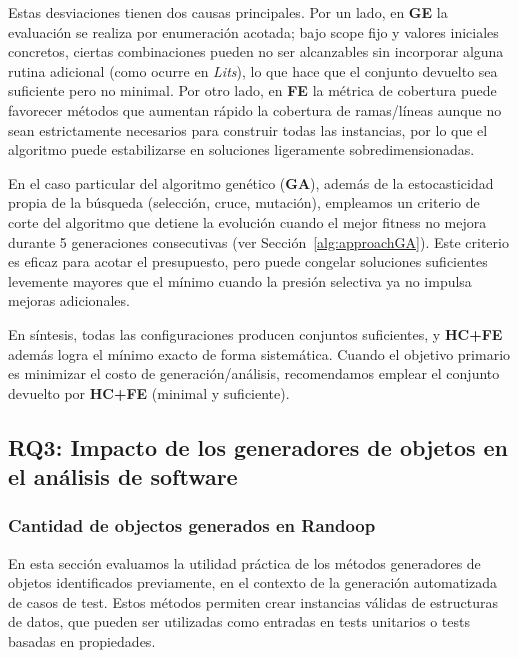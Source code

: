 Estas desviaciones tienen dos causas principales. Por un lado, en \textbf{GE} la
evaluación se realiza por enumeración acotada; bajo scope fijo y valores
iniciales concretos, ciertas combinaciones pueden no ser alcanzables sin
incorporar alguna rutina adicional (como ocurre en \emph{Lits}), lo que hace que
el conjunto devuelto sea suficiente pero no minimal. Por otro lado, en
\textbf{FE} la métrica de cobertura puede favorecer métodos que
aumentan rápido la cobertura de ramas/líneas aunque no sean estrictamente
necesarios para construir todas las instancias, por lo que el algoritmo puede estabilizarse en soluciones
ligeramente sobredimensionadas.

En el caso particular del algoritmo genético (\textbf{GA}), además de la
estocasticidad propia de la búsqueda (selección, cruce, mutación), empleamos un
criterio de corte del algoritmo que detiene la evolución cuando el mejor
fitness no mejora durante 5 generaciones consecutivas (ver
Sección~\ref{alg:approachGA}). Este criterio es eficaz para acotar el presupuesto,
pero puede congelar soluciones suficientes levemente mayores que el
mínimo cuando la presión selectiva ya no impulsa mejoras adicionales.

En síntesis, todas las configuraciones producen conjuntos suficientes, y
\textbf{HC+FE} además logra el mínimo exacto de forma sistemática. Cuando
el objetivo primario es minimizar el costo de generación/análisis, recomendamos
emplear el conjunto devuelto por \textbf{HC+FE} (minimal y suficiente).



\subsection{RQ3: Impacto de los generadores de objetos en el análisis de
software}

\subsubsection{Cantidad de objectos generados en Randoop}

En esta sección evaluamos la utilidad práctica de los métodos generadores de objetos 
identificados previamente, en el contexto de la generación automatizada de casos de test. 
Estos métodos permiten crear instancias válidas de estructuras de datos, que pueden ser utilizadas como 
entradas en tests unitarios o tests basadas en propiedades.

